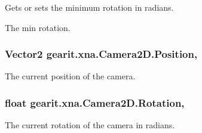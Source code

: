 Gets or sets the minimum rotation in radians. 

The min rotation.\hypertarget{classgearit_1_1xna_1_1_camera2_d_a521385c0e06f30380cf90da21d2807b2}{
\subsubsection[{Position}]{\setlength{\rightskip}{0pt plus 5cm}Vector2 gearit.\+xna.\+Camera2\+D.\+Position\hspace{0.3cm}{\ttfamily [get]}, {\ttfamily [set]}}}\label{classgearit_1_1xna_1_1_camera2_d_a521385c0e06f30380cf90da21d2807b2}


The current position of the camera. 

\hypertarget{classgearit_1_1xna_1_1_camera2_d_a17b022dbd270f8e9e6ac8782b3b564d0}{
\subsubsection[{Rotation}]{\setlength{\rightskip}{0pt plus 5cm}float gearit.\+xna.\+Camera2\+D.\+Rotation\hspace{0.3cm}{\ttfamily [get]}, {\ttfamily [set]}}}\label{classgearit_1_1xna_1_1_camera2_d_a17b022dbd270f8e9e6ac8782b3b564d0}


The current rotation of the camera in radians. 

